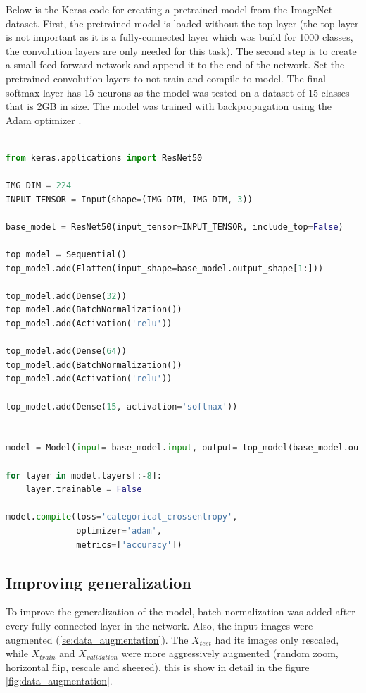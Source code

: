 \documentclass[times, utf8, diplomski]{fer}
\begin{document}
Below is the Keras code for creating a pretrained model from the ImageNet dataset. First, the pretrained model is loaded without the top layer (the top layer is not important as it is a fully-connected layer which was build for 1000 classes, the convolution layers are only needed for this task). The second step is to create a small feed-forward network and append it to the end of the network. Set the pretrained convolution layers to not train and compile to model. The final softmax layer has 15 neurons as the model was tested on a dataset of 15 classes that is 2GB in size. The model was trained with backpropagation using the Adam optimizer \citep{kingma_adam:_2014}.

\begin{lstlisting}[language=Python, caption=Creating a custom pretrained ResNet on the ImageNet dataset]

from keras.applications import ResNet50

IMG_DIM = 224
INPUT_TENSOR = Input(shape=(IMG_DIM, IMG_DIM, 3))

base_model = ResNet50(input_tensor=INPUT_TENSOR, include_top=False)

top_model = Sequential()
top_model.add(Flatten(input_shape=base_model.output_shape[1:]))

top_model.add(Dense(32))
top_model.add(BatchNormalization())
top_model.add(Activation('relu'))

top_model.add(Dense(64))
top_model.add(BatchNormalization())
top_model.add(Activation('relu'))

top_model.add(Dense(15, activation='softmax'))


model = Model(input= base_model.input, output= top_model(base_model.output))

for layer in model.layers[:-8]:
    layer.trainable = False
    
model.compile(loss='categorical_crossentropy',
              optimizer='adam',
              metrics=['accuracy'])
\end{lstlisting}

\subsection{Improving generalization}

To improve the generalization of the model, batch normalization was added after every fully-connected layer in the network. Also, the input images were augmented (\ref{se:data_augmentation}). The $X_{test}$ had its images only rescaled, while $X_{train}$ and $X_{validation}$ were more aggressively augmented (random zoom, horizontal flip, rescale and sheered), this is show in detail in the figure \ref{fig:data_augmentation}.
\end{document}
